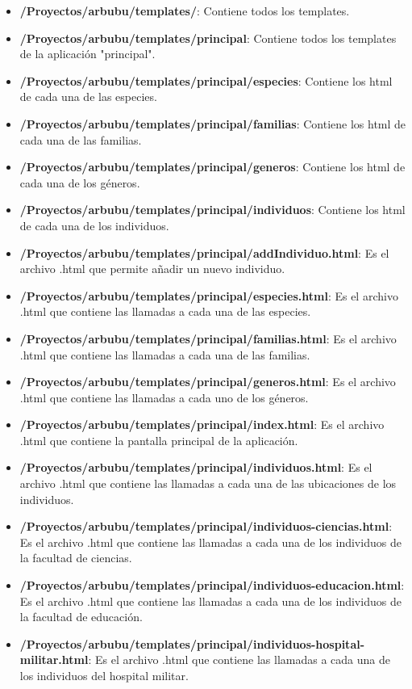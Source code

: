 \begin{itemize}
\begin{itemize}
\begin{itemize}
\begin{itemize}
				\item \textbf{/Proyectos/arbubu/templates/}: Contiene todos los templates.
				\item \textbf{/Proyectos/arbubu/templates/principal}: Contiene todos los templates de la aplicación "principal".
				\item \textbf{/Proyectos/arbubu/templates/principal/especies}: Contiene los html de cada una de las especies.
				\item \textbf{/Proyectos/arbubu/templates/principal/familias}: Contiene los html de cada una de las familias.
				\item \textbf{/Proyectos/arbubu/templates/principal/generos}: Contiene los html de cada una de los géneros.
				\item \textbf{/Proyectos/arbubu/templates/principal/individuos}: Contiene los html de cada una de los individuos.
				\item \textbf{/Proyectos/arbubu/templates/principal/addIndividuo.html}: Es el archivo .html que permite añadir un nuevo individuo.
				\item \textbf{/Proyectos/arbubu/templates/principal/especies.html}: Es el archivo .html que contiene las llamadas a cada una de las especies.
				\item \textbf{/Proyectos/arbubu/templates/principal/familias.html}: Es el archivo .html que contiene las llamadas a cada una de las familias.
				\item \textbf{/Proyectos/arbubu/templates/principal/generos.html}: Es el archivo .html que contiene las llamadas a cada uno de los géneros.
				\item \textbf{/Proyectos/arbubu/templates/principal/index.html}: Es el archivo .html que contiene la pantalla principal de la aplicación.
				\item \textbf{/Proyectos/arbubu/templates/principal/individuos.html}: Es el archivo .html que contiene las llamadas a cada una de las ubicaciones de los individuos.
				\item \textbf{/Proyectos/arbubu/templates/principal/individuos-ciencias.html}: Es el archivo .html que contiene las llamadas a cada una de los individuos de la facultad de ciencias.
				\item \textbf{/Proyectos/arbubu/templates/principal/individuos-educacion.html}: Es el archivo .html que contiene las llamadas a cada una de los individuos de la facultad de educación.
				\item \textbf{/Proyectos/arbubu/templates/principal/individuos-hospital-militar.html}: Es el archivo .html que contiene las llamadas a cada una de los individuos del hospital militar.

\end{itemize}
\end{itemize}
\end{itemize}
\end{itemize}
